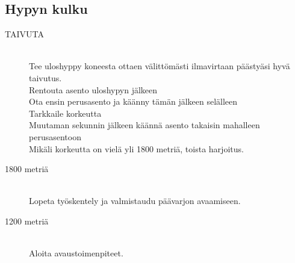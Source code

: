 \subsection{ Hypyn kulku }
\label{peruskoulutuksen-muut-suoritukset-hypyn-kulku}

\begin{description}
\item[TAIVUTA] \hfill \\ 
Tee uloshyppy koneesta ottaen välittömästi ilmavirtaan päästyäsi hyvä taivutus. \hfill \\ 
Rentouta asento uloshypyn jälkeen \hfill \\ 
Ota ensin perusasento ja käänny tämän jälkeen selälleen \hfill \\ 
Tarkkaile korkeutta \hfill \\ 
Muutaman sekunnin jälkeen käännä asento takaisin mahalleen perusasentoon \hfill \\ 
Mikäli korkeutta on vielä yli 1800 metriä, toista harjoitus. \hfill \\ 
\item[1800 metriä] \hfill \\ 
Lopeta työskentely ja valmistaudu päävarjon avaamiseen.  \hfill \\ 
\item[1200 metriä] \hfill \\ 
Aloita avaustoimenpiteet. \hfill \\ 
\end{description}

